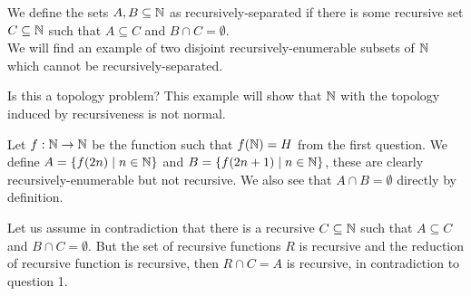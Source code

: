 \question{}
We define the sets $A, B \subseteq \mathbb{N}$ as recursively-separated if there is some recursive set $C \subseteq \mathbb{N}$ such that $A \subseteq C$ and $B \cap C = \emptyset$. \\
We will find an example of two disjoint recursively-enumerable subsets of $\mathbb{N}$ which cannot be recursively-separated.
\begin{solution}
	Is this a topology problem?
	This example will show that $\mathbb{N}$ with the topology induced by recursiveness is not normal.

	Let $f : \mathbb{N} \to \mathbb{N}$ be the function such that $f(\mathbb{N}) = H$ from the first question.
	We define $A = \{ f(2n) \mid n \in \mathbb{N} \}$ and $B = \{ f(2n + 1) \mid n \in \mathbb{N} \}$, these are clearly recursively-enumerable but not recursive.
	We also see that $A \cap B = \emptyset$ directly by definition.

	Let us assume in contradiction that there is a recursive $C \subseteq \mathbb{N}$ such that $A \subseteq C$ and $B \cap C = \emptyset$.
	But the set of recursive functions $R$ is recursive and the reduction of recursive function is recursive, then $R \cap C = A$ is recursive, in contradiction to question 1.
\end{solution}


